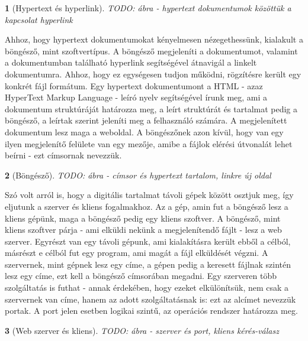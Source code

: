\documentclass[a4paper, 12pt, oneside]{article}
\newtheorem*{defin}{}
\begin{document}
\begin{center}
\begin{defin}[Hypertext és hyperlink]
TODO: ábra - hypertext dokumentumok közöttük a kapcsolat hyperlink
\end{defin}
\end{center}

Ahhoz, hogy hypertext dokumentumokat kényelmesen nézegethessünk, kialakult a böngésző, mint szoftvertípus. A böngésző megjeleníti a dokumentumot, valamint a dokumentumban található hyperlink segítségével átnavigál a linkelt dokumentumra. Ahhoz, hogy ez egységesen tudjon működni, rögzítésre került egy konkrét fájl formátum. Egy hypertext dokumentumont a HTML - azaz HyperText Markup Language - leíró nyelv segítségével írunk meg, ami a dokumentum struktúráját határozza meg, a leírt struktúrát és tartalmat pedig a böngésző, a leírtak szerint jeleníti meg a felhasználó számára. A megjelenített dokumentum lesz maga a weboldal. A böngészőnek azon kívül, hogy van egy ilyen megjelenítő felülete van egy mezője, amibe a fájlok elérési útvonalát lehet beírni - ezt címsornak nevezzük.
\begin{center}
\begin{defin}[Böngésző]
TODO: ábra - címsor és hypertext tartalom, linkre új oldal
\end{defin}
\end{center}
\bigbreak
Szó volt arról is, hogy a digitális tartalmat távoli gépek között osztjuk meg, így eljutunk a szerver és kliens fogalmakhoz. Az a gép, amin fut a böngésző lesz a kliens gépünk, maga a böngésző pedig egy kliens szoftver. A böngésző, mint kliens szoftver párja - ami elküldi nekünk a megjelenítendő fájlt - lesz a web szerver. Egyrészt van egy távoli gépunk, ami kialakításra került ebből a célból, másrészt e célból fut egy program, ami magát a fájl elküldését végzni. A szervernek, mint gépnek lesz egy címe, a gépen pedig a keresett fájlnak szintén lesz egy címe, ezt kell a böngésző címsorában megadni. Egy szerveren több szolgáltatás is futhat - annak érdekében, hogy ezeket elkülönítsük, nem csak a szervernek van címe, hanem az adott szolgáltatásnak is: ezt az alcímet nevezzük portak. A port jelen esetben logikai szintű, az operációs rendszer határozza meg.
\begin{center}
\begin{defin}[Web szerver és kliens]
TODO: ábra - szerver és port, kliens kérés-válasz
\end{defin}
\end{center}
\bigbreak
\end{document}
